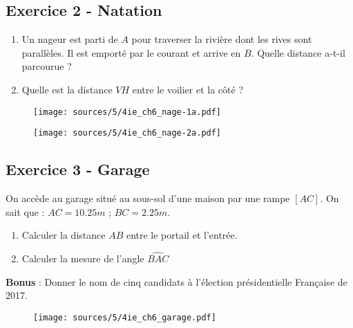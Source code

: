 \documentclass[10pt]{article}
\begin{document}
\begin{multicols}{2}

  \subsection*{Exercice 2 - Natation} 

  \begin{enumerate}
  \item[1.] Un nageur est parti de $A$ pour traverser la rivière dont les rives sont parallèles. Il est emporté par le courant et arrive en $B$. Quelle distance a-t-il parcourue ?

  \item[2.]Quelle est la distance $VH$ entre le voilier et la côté ?
  \end{enumerate}

  \begin{figure}[H]
    \centering
    \texttt{[image: sources/5/4ie\_ch6\_nage-1a.pdf]}
  \end{figure}

  \begin{figure}[H]
    \centering
    \texttt{[image: sources/5/4ie\_ch6\_nage-2a.pdf]}
  \end{figure}
\end{multicols}

\begin{multicols}{2}
  \subsection*{Exercice 3 - Garage}

  On accède au garage situé au sous-sol d'une maison par une rampe $[AC]$.
  On sait que : $AC = 10.25 m$ ; $BC = 2.25 m$.

  \begin{enumerate}
  \item[1.] Calculer la distance $AB$ entre le portail et l'entrée.
  \item[2.] Calculer la mesure de l'angle $\widehat{BAC}$
  \end{enumerate}
  \textbf{Bonus} : Donner le nom de cinq candidats à l'élection présidentielle Française de 2017.

  \begin{figure}[H]
    \centering
    \texttt{[image: sources/5/4ie\_ch6\_garage.pdf]}
  \end{figure}

\end{multicols}
\end{document}
